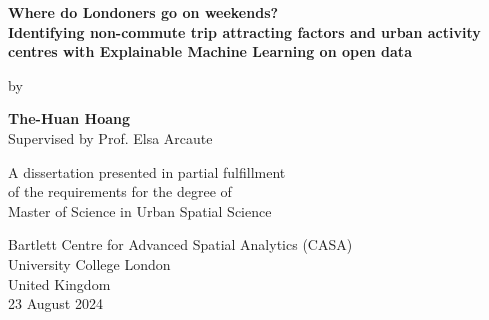 
 \begin{titlepage}
    \begin{center}
        \vspace*{-3cm}
        
        \vfill %
        

        {\LARGE\textbf{Where do Londoners go on weekends?\\Identifying non-commute trip attracting factors and urban activity centres with Explainable Machine Learning on open data\\}} 

        \vspace{2cm}
        by\\
        \vspace{1cm}
    
        {\LARGE\textbf{The-Huan Hoang\\}}
        \vspace{0.5cm}
        Supervised by Prof. Elsa Arcaute\\
    
        \vfill
             
        A dissertation presented in partial fulfillment \\
        of the requirements for the degree of\\
        Master of Science in Urban Spatial Science
             
        \vspace{1cm}
                 
        Bartlett Centre for Advanced Spatial Analytics (CASA) \\
        University College London\\
        United Kingdom\\
        23 August 2024
    
    \end{center}
\end{titlepage}
